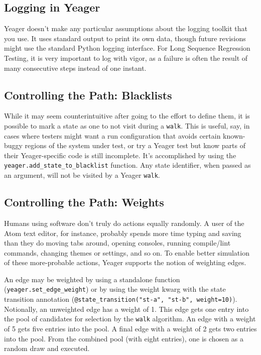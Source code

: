 \subsection{Logging in Yeager}
Yeager doesn't make any particular assumptions about the logging toolkit that you use. It uses standard output to print its own data, though future revisions might use the standard Python logging interface. For Long Sequence Regression Testing, it is very important to log with vigor, as a failure is often the result of many consecutive steps instead of one instant.

\subsection{Controlling the Path: Blacklists}
While it may seem counterintuitive after going to the effort to define them, it is possible to mark a state as one to not visit during a \texttt{walk}. This is useful, say, in cases where testers might want a run configuration that avoids certain known-buggy regions of the system under test, or try a Yeager test but know parts of their Yeager-specific code is still incomplete. It's accomplished by using the \texttt{yeager.add\_state\_to\_blacklist} function. Any state identifier, when passed as an argument, will not be visited by a Yeager \texttt{walk}.

\subsection{Controlling the Path: Weights}
Humans using software don't truly do actions equally randomly. A user of the Atom text editor, for instance, probably spends more time typing and saving than they do moving tabs around, opening consoles, running compile/lint commands, changing themes or settings, and so on. To enable better simulation of these more-probable actions, Yeager supports the notion of weighting edges.

An edge may be weighted by using a standalone function
\\(\texttt{yeager.set\_edge\_weight}) or by using the weight kwarg with the state transition annotation (\texttt{@state\_transition("st-a", "st-b", weight=10)}). Notionally, an unweighted edge has a weight of 1. This edge gets one entry into the pool of candidates for selection by the \texttt{walk} algorithm. An edge with a weight of 5 gets five entries into the pool. A final edge with a weight of 2 gets two entries into the pool. From the combined pool (with eight entries), one is chosen as a random draw and executed.

